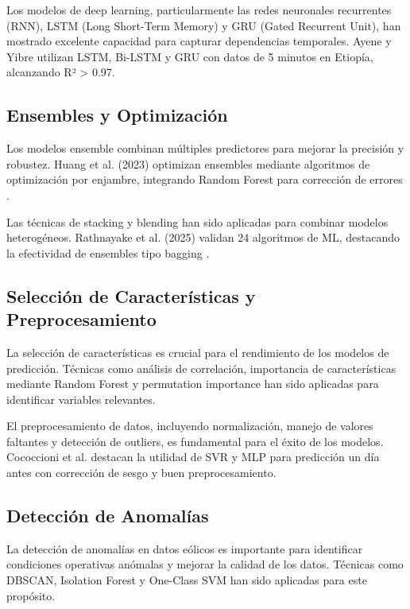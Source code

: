 \documentclass[conference]{IEEEtran}
\begin{document}
	Los modelos de deep learning, particularmente las redes neuronales recurrentes (RNN), LSTM (Long Short-Term Memory) y GRU (Gated Recurrent Unit), han mostrado excelente capacidad para capturar dependencias temporales. Ayene y Yibre \cite{ayene2024wind} utilizan LSTM, Bi-LSTM y GRU con datos de 5 minutos en Etiopía, alcanzando R² > 0.97.
	
	\subsection{Ensembles y Optimización}
	Los modelos ensemble combinan múltiples predictores para mejorar la precisión y robustez. Huang et al. (2023) optimizan ensembles mediante algoritmos de optimización por enjambre, integrando Random Forest para corrección de errores \cite{huang2023ensemble}.
	
	Las técnicas de stacking y blending han sido aplicadas para combinar modelos heterogéneos. Rathnayake et al. (2025) validan 24 algoritmos de ML, destacando la efectividad de ensembles tipo bagging \cite{rathnayake2025predicting}.
	
	\subsection{Selección de Características y Preprocesamiento}
	La selección de características es crucial para el rendimiento de los modelos de predicción. Técnicas como análisis de correlación, importancia de características mediante Random Forest y permutation importance han sido aplicadas para identificar variables relevantes.
	
	El preprocesamiento de datos, incluyendo normalización, manejo de valores faltantes y detección de outliers, es fundamental para el éxito de los modelos. Cococcioni et al. \cite{cococcioni2012oneday} destacan la utilidad de SVR y MLP para predicción un día antes con corrección de sesgo y buen preprocesamiento.
	
	\subsection{Detección de Anomalías}
	La detección de anomalías en datos eólicos es importante para identificar condiciones operativas anómalas y mejorar la calidad de los datos. Técnicas como DBSCAN, Isolation Forest y One-Class SVM han sido aplicadas para este propósito.
	
\end{document}
